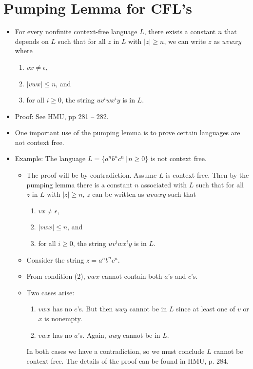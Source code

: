 \documentclass[]{article}
\begin{document}
\section{Pumping Lemma for CFL's}
  \begin{itemize}
    \item For every nonfinite context-free language $L$, there exists a 
    constant $n$ that depends on $L$ such that for all $z$ in $L$ with $|z| 
    \geq n$, we can write $z$ as $uvwxy$ where
      \begin{enumerate}
        \item $vx \neq \epsilon$,
        \item $|vwx| \leq n$, and
        \item for all $i \geq 0$, the string $uv^iwx^iy$ is in $L$.
      \end{enumerate}
    \item Proof: See HMU, pp 281 -- 282.
    \item One important use of the pumping lemma is to prove certain languages 
    are not context free.
    \item Example: The language $L = \{a^nb^nc^n \, | \, n \geq 0 \}$ is not 
    context free.
      \begin{itemize}
        \item The proof will be by contradiction. Assume $L$ is context free. 
        Then by the pumping lemma there is a constant $n$ associated with $L$ 
        such that for all $z$ in $L$ with $|z| \geq n$, $z$ can be written as 
        $uvwxy$ such that
          \begin{enumerate}
            \item $vx \neq \epsilon$,
            \item $|vwx| \leq n$, and 
            \item for all $i \geq 0$, the string $uv^iwx^iy$ is in $L$.
          \end{enumerate}
        \item Consider the string $z = a^nb^nc^n$.
        \item From condition (2), $vwx$ cannot contain both $a$'s and $c$'s.
        \item Two cases arise:
          \begin{enumerate}
            \item $vwx$ has no $c$'s. But then $uwy$ cannot be in $L$ since at 
            least one of $v$ or $x$ is nonempty.
            \item $vwx$ has no $a$'s. Again, $uwy$ cannot be in $L$.
          \end{enumerate}
        In both cases we have a contradiction, so we must conclude $L$ cannot 
        be context free. The details of the proof can be found in HMU, p. 284.
      \end{itemize}
  \end{itemize}
\end{document}
